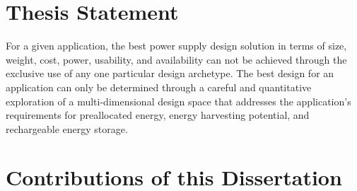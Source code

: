 \section{Thesis Statement}

%
%
%
%
%
%


For a given application, the best power supply design solution in terms of size, weight, cost, power, usability, and availability can not be achieved through the exclusive use of any one particular design archetype. The best design for an application can only be determined through a careful and quantitative exploration of a multi-dimensional design space that addresses the application's requirements for preallocated energy, energy harvesting potential, and rechargeable energy storage. 


\the\textwidth

\section{Contributions of this Dissertation}


